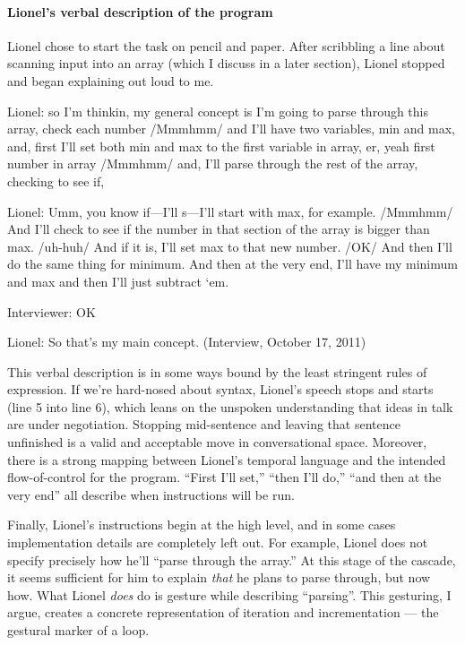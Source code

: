 \paragraph{Lionel's verbal description of the
program}\label{lionels-verbal-description-of-the-program}

Lionel chose to start the task on pencil and paper. After scribbling a
line about scanning input into an array (which I discuss in a later
section), Lionel stopped and began explaining out loud to me.

Lionel: so I'm thinkin, my general concept is I'm going to parse through
this array, check each number /Mmmhmm/ and I'll have two variables, min
and max, and, first I'll set both min and max to the first variable in
array, er, yeah first number in array /Mmmhmm/ and, I'll parse through
the rest of the array, checking to see if,

Lionel: Umm, you know if---I'll s---I'll start with max, for example.
/Mmmhmm/ And I'll check to see if the number in that section of the
array is bigger than max. /uh-huh/ And if it is, I'll set max to that
new number. /OK/ And then I'll do the same thing for minimum. And then
at the very end, I'll have my minimum and max and then I'll just
subtract `em.

Interviewer: OK

Lionel: So that's my main concept. (Interview, October 17, 2011)

This verbal description is in some ways bound by the least stringent
rules of expression. If we're hard-nosed about syntax, Lionel's speech
stops and starts (line 5 into line 6), which leans on the unspoken
understanding that ideas in talk are under negotiation. Stopping
mid-sentence and leaving that sentence unfinished is a valid and
acceptable move in conversational space. Moreover, there is a strong
mapping between Lionel's temporal language and the intended
flow-of-control for the program. ``First I'll set,'' ``then I'll do,''
``and then at the very end'' all describe when instructions will be run.

Finally, Lionel's instructions begin at the high level, and in some
cases implementation details are completely left out. For example,
Lionel does not specify precisely how he'll ``parse through the array.''
At this stage of the cascade, it seems sufficient for him to explain
\emph{that} he plans to parse through, but now how. What Lionel
\emph{does} do is gesture while describing ``parsing''. This gesturing,
I argue, creates a concrete representation of iteration and
incrementation --- the gestural marker of a loop.


